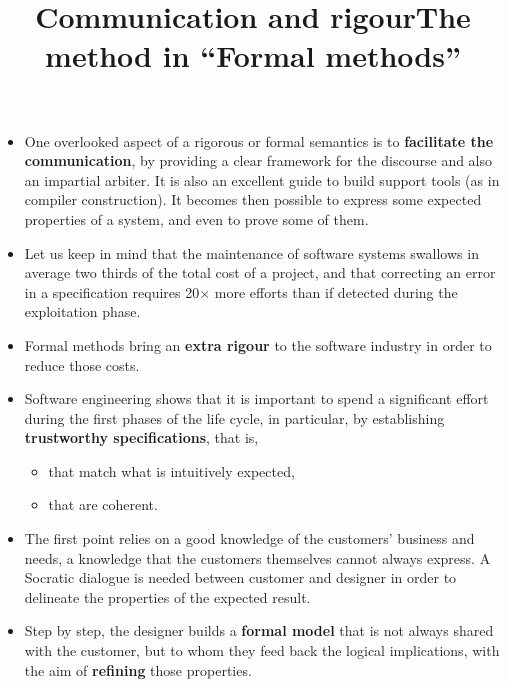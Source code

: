 \documentclass[wide]{slides}
\begin{document}
\begin{slide}
  \title{Communication and rigour}

  \begin{itemize}

    \item One overlooked aspect of a rigorous or formal semantics is
      to \textbf{facilitate the communication}, by providing a clear
      framework for the discourse and also an impartial arbiter. It is
      also an excellent guide to build support tools (as in compiler
      construction). It becomes then possible to express some expected
      properties of a system, and even to prove some of them.

    \item Let us keep in mind that the maintenance of software systems
      swallows in average two thirds of the total cost of a project,
      and that correcting an error in a specification requires
      20$\times$ more efforts than if detected during the exploitation
      phase.

    \item Formal methods bring an \textbf{extra rigour} to the
      software industry in order to reduce those costs.

  \end{itemize}

\end{slide}

\begin{slide}
  \title{The method in ``Formal methods''}

  \begin{itemize}

    \item Software engineering shows that it is important to spend a
      significant effort during the first phases of the life cycle, in
      particular, by establishing \textbf{trustworthy specifications},
      that is,

      \begin{itemize}

        \item that match what is intuitively expected,

        \item that are coherent.

      \end{itemize}

    \item The first point relies on a good knowledge of the customers'
      business and needs, a knowledge that the customers themselves
      cannot always express. A Socratic dialogue is needed between
      customer and designer in order to delineate the properties of
      the expected result.

    \item Step by step, the designer builds a \textbf{formal model}
      that is not always shared with the customer, but to whom they
      feed back the logical implications, with the aim of
      \textbf{refining} those properties.

  \end{itemize}
\end{slide}
\end{document}
